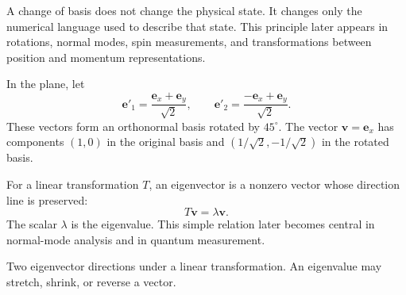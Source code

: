 \begin{physical}
A change of basis does not change the physical state. It changes only the numerical language used to describe that state. This principle later appears in rotations, normal modes, spin measurements, and transformations between position and momentum representations.
\end{physical}

\begin{workedexample}
In the plane, let
\[
\mathbf e'_1=\frac{\mathbf e_x+\mathbf e_y}{\sqrt2},
\qquad
\mathbf e'_2=\frac{-\mathbf e_x+\mathbf e_y}{\sqrt2}.
\]
These vectors form an orthonormal basis rotated by $45^\circ$. The vector $\mathbf v=\mathbf e_x$ has components $(1,0)$ in the original basis and $(1/\sqrt2,-1/\sqrt2)$ in the rotated basis.
\end{workedexample}

For a linear transformation $T$, an eigenvector is a nonzero vector whose direction line is preserved:
\[
T\mathbf v=\lambda\mathbf v.
\]
The scalar $\lambda$ is the eigenvalue. This simple relation later becomes central in normal-mode analysis and in quantum measurement.

\begin{bookfigure}{Two eigenvector directions under a linear transformation. An eigenvalue may stretch, shrink, or reverse a vector.}

\end{bookfigure}
